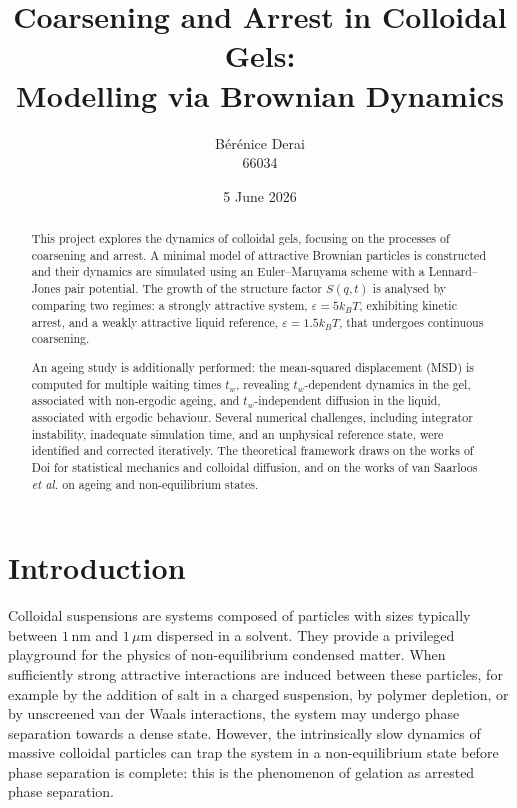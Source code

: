 \documentclass[11pt,a4paper]{article}
\title{\textbf{Coarsening and Arrest in Colloidal Gels:}\\
Modelling via Brownian Dynamics}
\author{B\'er\'enice Derai\\66034}
\date{5 June 2026}
\begin{document}
\maketitle

\begin{abstract}
This project explores the dynamics of colloidal gels, focusing on the processes of coarsening and arrest. A minimal model of attractive Brownian particles is constructed and their dynamics are simulated using an Euler--Maruyama scheme with a Lennard--Jones pair potential. The growth of the structure factor $S(q,t)$ is analysed by comparing two regimes: a strongly attractive system, $\varepsilon = 5 k_B T$, exhibiting kinetic arrest, and a weakly attractive liquid reference, $\varepsilon = 1.5 k_B T$, that undergoes continuous coarsening.

An ageing study is additionally performed: the mean-squared displacement (MSD) is computed for multiple waiting times $t_w$, revealing $t_w$-dependent dynamics in the gel, associated with non-ergodic ageing, and $t_w$-independent diffusion in the liquid, associated with ergodic behaviour. Several numerical challenges, including integrator instability, inadequate simulation time, and an unphysical reference state, were identified and corrected iteratively. The theoretical framework draws on the works of Doi for statistical mechanics and colloidal diffusion, and on the works of van Saarloos \textit{et al.} on ageing and non-equilibrium states.
\end{abstract}

\tableofcontents
\newpage

\section{Introduction}

Colloidal suspensions are systems composed of particles with sizes typically between $1\,\mathrm{nm}$ and $1\,\mu\mathrm{m}$ dispersed in a solvent. They provide a privileged playground for the physics of non-equilibrium condensed matter. When sufficiently strong attractive interactions are induced between these particles, for example by the addition of salt in a charged suspension, by polymer depletion, or by unscreened van der Waals interactions, the system may undergo phase separation towards a dense state. However, the intrinsically slow dynamics of massive colloidal particles can trap the system in a non-equilibrium state before phase separation is complete: this is the phenomenon of gelation as arrested phase separation.
\end{document}
